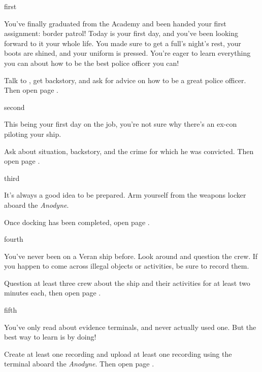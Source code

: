 \documentclass[greennotebook]{guildcamp4} %
\begin{document}
\startnotebook{\nCgoodNotebook{}}

\begin{page}{first}

You've finally graduated from the Academy and been handed your first assignment: border patrol! Today is your first day, and you've been looking forward to it your whole life. You made sure to get a full's night's rest, your boots are shined, and your uniform is pressed. You're eager to learn everything you can about how to be the best police officer you can!

Talk to \cCbad{}, get  backstory, and ask for  advice on how to be a great police officer. Then open page .

\end{page}

\begin{page}{second}

This being your first day on the job, you're not sure why there's an ex-con piloting your ship. 

Ask \cPilot{} about  situation,  backstory, and the crime for which he was convicted. Then open page .

\end{page}

\begin{page}{third}

It's always a good idea to be prepared. Arm yourself from the weapons locker aboard the \emph{Anodyne}.

Once docking has been completed, open page .

\end{page}

\begin{page}{fourth}

You've never been on a Veran ship before. Look around and question the crew. If you happen to come across illegal objects or activities, be sure to record them.

Question at least three crew about the ship and their activities for at least two minutes each, then open page .

\end{page}

\begin{page}{fifth}

You've only read about evidence terminals, and never actually used one. But the best way to learn is by doing!

Create at least one recording and upload at least one recording using the terminal aboard the \emph {Anodyne}. Then open page .

\end{page}
\end{document}
